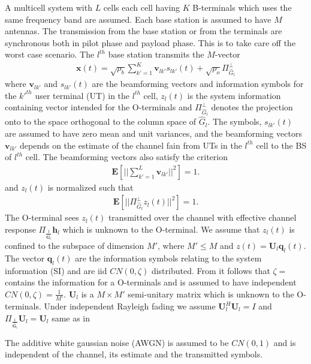\documentclass[10pt, a4paper, twoside,fleqn]{article}
\begin{document}
	A multicell system with $L$ cells each cell having $K$ B-terminals which uses the same frequency band are assumed. Each base station is assumed to have $M$ antennas. The transmission from the base station or from the terminals are synchronous both in pilot phase and payload phase. This is to take care off the worst case scenario. The $l^{th}$ base station transmits the $M$-vector
\begin{eqnarray}
	\pmb{x}(t) = \sqrt{\rho_b}\sum\limits_{k'=1}^{K}\boldsymbol{v}_{lk'}s_{lk'}(t)
    		      + \sqrt{\rho_o}\Pi^{\perp}_{{\widehat{G}_l}}
\end{eqnarray}
where $\pmb{v}_{lk'}$ and $s_{lk'}(t)$ are the beamforming vectors and information symbols for the $k'^{th}$ user terminal (UT) in the $l^{th}$ cell, $z_l(t)$ is the system information containing vector intended for the O-terminals and $\Pi^{\perp}_{{\widehat{G}_l}}$ denotes the projection onto to the space orthogonal to the column space of $\hat G_l$. The symbols, $s_{lk'}(t)$ are assumed to have zero mean and unit variances, and the beamforming vectors $\pmb{v}_{lk'}$ depends on the estimate of the channel fain from UTs in the $l^{th}$ cell to the BS of $l^{th}$ cell. 
The beamforming vectors also satisfy the criterion
\begin{eqnarray}
	\pmb{E}\left[||\sum\limits_{k'=1}^{L}\pmb{v}_{lk'}||^2\right]=1.
\end{eqnarray}
and $z_l(t)$ is normalized such that
\begin{eqnarray}\label{eqn:zlcondition}
	\pmb{E}\left[||\Pi^{\perp}_{{\widehat{G}_l}}z_l(t)||^2\right]=1.
\end{eqnarray}
The O-terminal sees $z_l(t)$ transmitted over the channel with effective channel response $\Pi_{\frac{1}{\pmb{\hat G}_l}}\pmb{h}_l$ which is unknown to the O-terminal. We assume that $z_l(t)$ is confined to the subspace of dimension $M'$, where $M'\leq M$ and $z(t) = \pmb{U}_l\pmb{q}_l(t)$. The vector $\pmb{q}_l(t)$ are the information symbols relating to the system information (SI) and are iid $CN(0,\zeta)$ distributed. From \cite{bib:jbb} it follows that $\zeta=$ contains the information for a O-terminals  and is assumed to have independent $CN(0, \zeta)=\frac{1}{M'}$. $\pmb{U}_l$ is a $M\times M'$ semi-unitary matrix which is unknown to the O-terminals. Under independent Rayleigh fading we assume $\pmb{U}_l^H\pmb{U}_l=I$ and $\Pi_{\frac{1}{\pmb{\hat G}_l}}\pmb{U}_l=\pmb{U}_l$ same as in \cite{bib:jbb}

The additive white gaussian noise (AWGN) is assumed to be $CN(0,1)$ and is independent of the channel, its estimate and the transmitted symbols.
\end{document}
